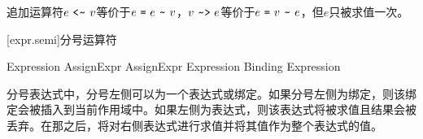 \pnum
追加运算符$e\ \tcode{<\~}\ v$等价于$e\ \tcode{=}\ e\ \tcode{\~}\ v$，$v\ \tcode{\~>}\ e$等价于$e\ \tcode{=}\ v\ \tcode{\~}\ e$，但$e$只被求值一次。

[expr.semi]{分号运算符}

\begin{bnf}{Expression}
    AssignExpr \br
    AssignExpr \terminal{;} Expression\br
    Binding \terminal{;} Expression
\end{bnf}

\pnum
分号表达式中，分号左侧可以为一个表达式或绑定。如果分号左侧为绑定，则该绑定会被插入到当前作用域中。如果左侧为表达式，则该表达式将被求值且结果会被丢弃。在那之后，将对右侧表达式进行求值并将其值作为整个表达式的值。